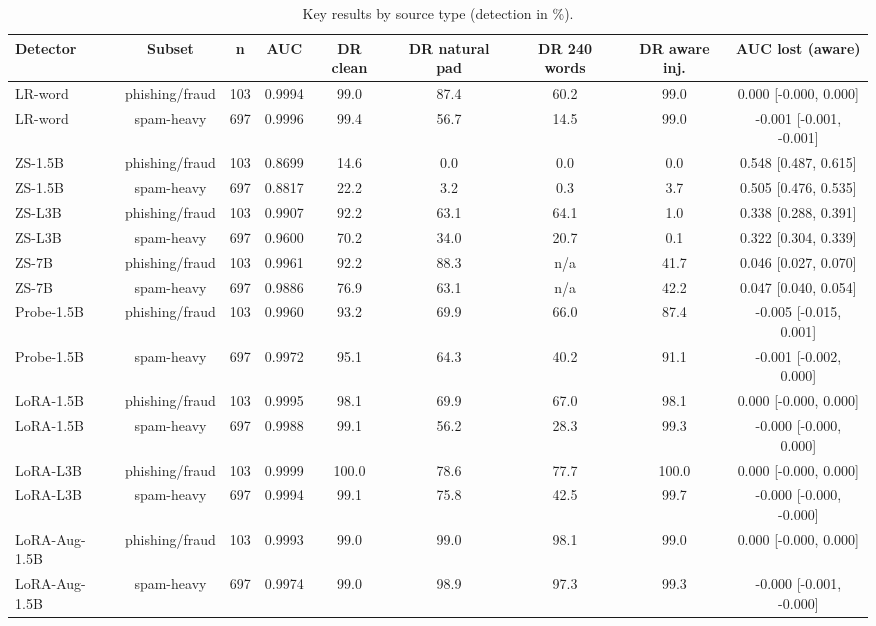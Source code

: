 \begin{table}[t]
\centering
\caption{Key results by source type (detection in \%).}
\label{tab:phishspam}
\footnotesize
\begin{tabular}{lcccccccc}
\toprule
\textbf{Detector} & \textbf{Subset} & \textbf{n} & \textbf{AUC} & \textbf{DR clean} & \textbf{DR natural pad} & \textbf{DR 240 words} & \textbf{DR aware inj.} & \textbf{AUC lost (aware)} \\
\midrule
LR-word & phishing/fraud & 103 & 0.9994 & 99.0 & 87.4 & 60.2 & 99.0 & 0.000 [-0.000, 0.000] \\
LR-word & spam-heavy & 697 & 0.9996 & 99.4 & 56.7 & 14.5 & 99.0 & -0.001 [-0.001, -0.001] \\
ZS-1.5B & phishing/fraud & 103 & 0.8699 & 14.6 & 0.0 & 0.0 & 0.0 & 0.548 [0.487, 0.615] \\
ZS-1.5B & spam-heavy & 697 & 0.8817 & 22.2 & 3.2 & 0.3 & 3.7 & 0.505 [0.476, 0.535] \\
ZS-L3B & phishing/fraud & 103 & 0.9907 & 92.2 & 63.1 & 64.1 & 1.0 & 0.338 [0.288, 0.391] \\
ZS-L3B & spam-heavy & 697 & 0.9600 & 70.2 & 34.0 & 20.7 & 0.1 & 0.322 [0.304, 0.339] \\
ZS-7B & phishing/fraud & 103 & 0.9961 & 92.2 & 88.3 & n/a & 41.7 & 0.046 [0.027, 0.070] \\
ZS-7B & spam-heavy & 697 & 0.9886 & 76.9 & 63.1 & n/a & 42.2 & 0.047 [0.040, 0.054] \\
Probe-1.5B & phishing/fraud & 103 & 0.9960 & 93.2 & 69.9 & 66.0 & 87.4 & -0.005 [-0.015, 0.001] \\
Probe-1.5B & spam-heavy & 697 & 0.9972 & 95.1 & 64.3 & 40.2 & 91.1 & -0.001 [-0.002, 0.000] \\
LoRA-1.5B & phishing/fraud & 103 & 0.9995 & 98.1 & 69.9 & 67.0 & 98.1 & 0.000 [-0.000, 0.000] \\
LoRA-1.5B & spam-heavy & 697 & 0.9988 & 99.1 & 56.2 & 28.3 & 99.3 & -0.000 [-0.000, 0.000] \\
LoRA-L3B & phishing/fraud & 103 & 0.9999 & 100.0 & 78.6 & 77.7 & 100.0 & 0.000 [-0.000, 0.000] \\
LoRA-L3B & spam-heavy & 697 & 0.9994 & 99.1 & 75.8 & 42.5 & 99.7 & -0.000 [-0.000, -0.000] \\
LoRA-Aug-1.5B & phishing/fraud & 103 & 0.9993 & 99.0 & 99.0 & 98.1 & 99.0 & 0.000 [-0.000, 0.000] \\
LoRA-Aug-1.5B & spam-heavy & 697 & 0.9974 & 99.0 & 98.9 & 97.3 & 99.3 & -0.000 [-0.001, -0.000] \\

\end{tabular}
\end{table}
